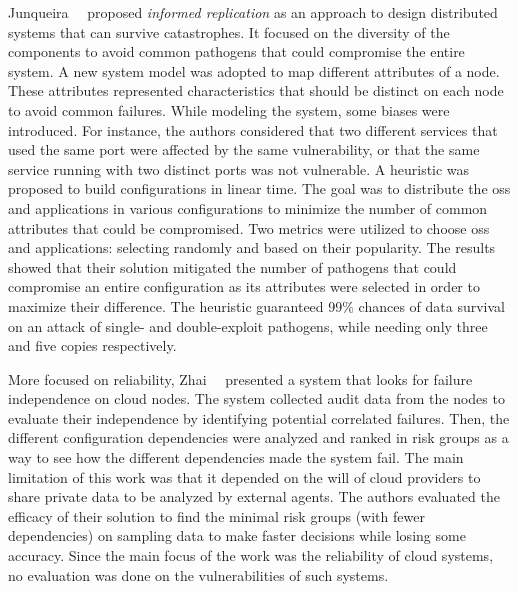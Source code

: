 Junqueira~\etal{}~\cite{Junqueira:2005} proposed \emph{informed replication} as an approach to design distributed systems that can survive catastrophes.
It focused on the diversity of the components to avoid common pathogens that could compromise the entire system.
A new system model was adopted to map different attributes of a node. 
These attributes represented characteristics that should be distinct on each node to avoid common failures.
While modeling the system, some biases were introduced.
For instance, the authors considered that two different services that used the same port were affected by the same vulnerability, or that the same service running with two distinct ports was not vulnerable.
A heuristic was proposed to build configurations in linear time.
The goal was to distribute the \glspl{os} and applications in various configurations to minimize the number of common attributes that could be compromised.
Two metrics were utilized to choose \glspl{os} and applications: selecting randomly and based on their popularity.
The results showed that their solution mitigated the number of pathogens that could compromise an entire configuration as its attributes were selected in order to maximize their difference.
The heuristic guaranteed 99\% chances of data survival on an attack of single- and double-exploit pathogens, while needing only three and five copies respectively.


More focused on reliability, Zhai~\etal{}~\cite{Zhai:2014} presented a system that looks for failure independence on cloud nodes.
The system collected audit data from the nodes to evaluate their independence by identifying potential correlated failures.
Then, the different configuration dependencies were analyzed and ranked in risk groups as a way to see how the different dependencies made the system fail.
The main limitation of this work was that it depended on the will of cloud providers to share private data to be analyzed by external agents.
The authors evaluated the efficacy of their solution to find the minimal risk groups (with fewer dependencies) on sampling data to make faster decisions while losing some accuracy.
Since the main focus of the work was the reliability of cloud systems, no evaluation was done on the vulnerabilities of such systems.

